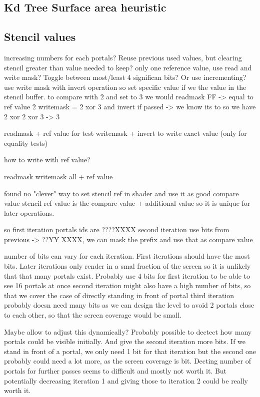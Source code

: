 \subsection{Kd Tree Surface area heuristic}
\cite{ macdonald:1990:heuristics}
\subsection{Stencil values}
increasing numbers for each portals?
Reuse previous used values, but clearing stencil greater than value needed to keep?
only one reference value, use read and write mask? Toggle between most/least 4 significan bits? Or use incrementing?
use write mask with invert operation so set specific value if we the value in the stencil buffer.
to compare with 2 and set to 3 we would
readmask FF -> equal to ref value 2
writemask = 2 xor 3 and invert if passed -> we know its to so we have 2 xor 2 xor 3 -> 3

readmask + ref value for test
writemask + invert to write exact value (only for equality tests)

how to write with ref value?

readmask
writemask all + ref value

found no "clever" way to set stencil ref in shader and use it as good compare value
stencil ref value is the compare value + additional value so it is unique for later operations.

so first iteration portals ids are ????XXXX
second iteration use bits from previous -> ??YY XXXX, we can mask the prefix and use that as compare value

number of bits can vary for each iteration. First iterations should have the most bits. Later iterations only render in a smal fraction of the screen so it is unlikely that that many portals exist.
Probably use 4 bits for first iteration to be able to see 16 portals at once
second iteration might also have a high number of bits, so that we cover the case of directly standing in front of portal
third iteration probably doesn need many bits as we can design the level to avoid 2 portals close to each other, so that the screen coverage would be small.

Maybe allow to adjust this dynamically? Probably possible to dectect how many portals could be visible initially. And give the second iteration more bits. If we stand in front of a portal, we only need 1 bit for that iteration but the second one probably could need a lot more, as the screen coverage is bit.
Decting number of portals for further passes seems to difficult and mostly not worth it. But potentially decreasing iteration 1 and giving those to iteration 2 could be really worth it.


